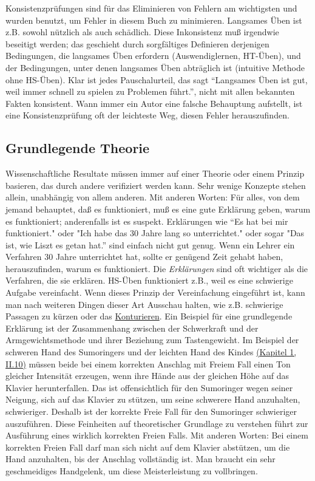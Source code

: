 Konsistenzprüfungen sind für das Eliminieren von Fehlern am wichtigsten und wurden benutzt, um Fehler in diesem Buch zu minimieren.
 Langsames Üben ist z.B. sowohl nützlich als auch schädlich.
 Diese Inkonsistenz muß irgendwie beseitigt werden; das geschieht durch sorgfältiges Definieren derjenigen Bedingungen, die langsames Üben erfordern (Auswendiglernen, HT-Üben), und der Bedingungen, unter denen langsames Üben abträglich ist (intuitive Methode ohne HS-Üben).
 Klar ist jedes Pauschalurteil, das sagt \enquote{Langsames Üben ist gut, weil immer schnell zu spielen zu Problemen führt.}, nicht mit allen bekannten Fakten konsistent.
 Wann immer ein Autor eine falsche Behauptung aufstellt, ist eine Konsistenzprüfung oft der leichteste Weg, diesen Fehler herauszufinden.
 \hypertarget{c3_3f}{}

\subsection{Grundlegende Theorie}

Wissenschaftliche Resultate müssen immer auf einer Theorie oder einem Prinzip basieren, das durch andere verifiziert werden kann.
 Sehr wenige Konzepte stehen allein, unabhängig von allem anderen.
 Mit anderen Worten: Für alles, von dem jemand behauptet, daß es funktioniert, muß es eine gute Erklärung geben, warum es funktioniert; anderenfalls ist es suspekt.
 Erklärungen wie \enquote{Es hat bei mir funktioniert." oder "Ich habe das 30 Jahre lang so unterrichtet." oder sogar "Das ist, wie Liszt es getan hat.} sind einfach nicht gut genug.
 Wenn ein Lehrer ein Verfahren 30 Jahre unterrichtet hat, sollte er genügend Zeit gehabt haben, herauszufinden, warum es funktioniert.
 Die \textit{Erklärungen} sind oft wichtiger als die Verfahren, die sie erklären.
 HS-Üben funktioniert z.B., weil es eine schwierige Aufgabe vereinfacht.
 Wenn dieses Prinzip der Vereinfachung eingeführt ist, kann man nach weiteren Dingen dieser Art Ausschau halten, wie z.B. schwierige Passagen zu kürzen oder das \hyperlink{c1iii8}{Konturieren}.
 Ein Beispiel für eine grundlegende Erklärung ist der Zusammenhang zwischen der Schwerkraft und der Armgewichtsmethode und ihrer Beziehung zum Tastengewicht.
 Im Beispiel der schweren Hand des Sumoringers und der leichten Hand des Kindes \hyperlink{c1ii10}{(Kapitel 1, II.10)} müssen beide bei einem korrekten Anschlag mit Freiem Fall einen Ton gleicher Intensität erzeugen, wenn ihre Hände aus der gleichen Höhe auf das Klavier herunterfallen.
 Das ist offensichtlich  für den Sumoringer wegen seiner Neigung, sich auf das Klavier zu stützen, um seine schwerere Hand anzuhalten, schwieriger.
 Deshalb ist der korrekte Freie Fall für den Sumoringer schwieriger auszuführen.
 Diese Feinheiten auf theoretischer Grundlage zu verstehen führt zur Ausführung eines wirklich korrekten Freien Falls.
 Mit anderen Worten: Bei einem korrekten Freien Fall darf man sich nicht auf dem Klavier abstützen, um die Hand anzuhalten, bis der Anschlag vollständig ist.
 Man braucht ein sehr geschmeidiges Handgelenk, um diese Meisterleistung zu vollbringen.
 

